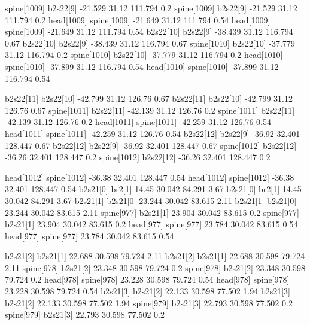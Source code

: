 spine[1009]    b2s22[9]    -21.529    31.12    111.794    0.2
spine[1009]    b2s22[9]    -21.529    31.12    111.794    0.2
head[1009]    spine[1009]    -21.649    31.12    111.794    0.54
head[1009]    spine[1009]    -21.649    31.12    111.794    0.54
b2s22[10]    b2s22[9]    -38.439    31.12    116.794    0.67
b2s22[10]    b2s22[9]    -38.439    31.12    116.794    0.67
spine[1010]    b2s22[10]    -37.779    31.12    116.794    0.2
spine[1010]    b2s22[10]    -37.779    31.12    116.794    0.2
head[1010]    spine[1010]    -37.899    31.12    116.794    0.54
head[1010]    spine[1010]    -37.899    31.12    116.794    0.54


b2s22[11]    b2s22[10]    -42.799    31.12    126.76    0.67
b2s22[11]    b2s22[10]    -42.799    31.12    126.76    0.67
spine[1011]    b2s22[11]    -42.139    31.12    126.76    0.2
spine[1011]    b2s22[11]    -42.139    31.12    126.76    0.2
head[1011]    spine[1011]    -42.259    31.12    126.76    0.54
head[1011]    spine[1011]    -42.259    31.12    126.76    0.54
b2s22[12]    b2s22[9]    -36.92    32.401    128.447    0.67
b2s22[12]    b2s22[9]    -36.92    32.401    128.447    0.67
spine[1012]    b2s22[12]    -36.26    32.401    128.447    0.2
spine[1012]    b2s22[12]    -36.26    32.401    128.447    0.2


head[1012]    spine[1012]    -36.38    32.401    128.447    0.54
head[1012]    spine[1012]    -36.38    32.401    128.447    0.54
b2s21[0]    br2[1]    14.45    30.042    84.291    3.67
b2s21[0]    br2[1]    14.45    30.042    84.291    3.67
b2s21[1]    b2s21[0]    23.244    30.042    83.615    2.11
b2s21[1]    b2s21[0]    23.244    30.042    83.615    2.11
spine[977]    b2s21[1]    23.904    30.042    83.615    0.2
spine[977]    b2s21[1]    23.904    30.042    83.615    0.2
head[977]    spine[977]    23.784    30.042    83.615    0.54
head[977]    spine[977]    23.784    30.042    83.615    0.54


b2s21[2]    b2s21[1]    22.688    30.598    79.724    2.11
b2s21[2]    b2s21[1]    22.688    30.598    79.724    2.11
spine[978]    b2s21[2]    23.348    30.598    79.724    0.2
spine[978]    b2s21[2]    23.348    30.598    79.724    0.2
head[978]    spine[978]    23.228    30.598    79.724    0.54
head[978]    spine[978]    23.228    30.598    79.724    0.54
b2s21[3]    b2s21[2]    22.133    30.598    77.502    1.94
b2s21[3]    b2s21[2]    22.133    30.598    77.502    1.94
spine[979]    b2s21[3]    22.793    30.598    77.502    0.2
spine[979]    b2s21[3]    22.793    30.598    77.502    0.2


